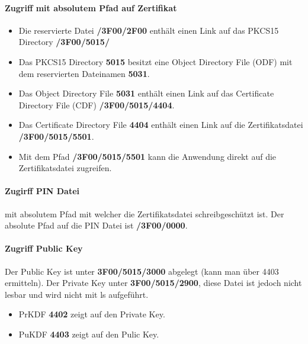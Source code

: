 \paragraph{Zugriff mit absolutem Pfad auf Zertifikat}
\begin{itemize}
    \item Die reservierte Datei \textbf{/3F00/2F00} enthält einen Link auf das PKCS15 Directory \textbf{/3F00/5015/}
    \item Das PKCS15 Directory \textbf{5015} besitzt eine Object Directory File (ODF) mit dem reservierten Dateinamen \textbf{5031}.
    \item Das Object Directory File \textbf{5031} enthält einen Link auf das Certificate Directory File (CDF) \textbf{/3F00/5015/4404}.
    \item Das Certificate Directory File \textbf{4404} enthält einen Link auf die Zertifikatsdatei \textbf{/3F00/5015/5501}.
    \item Mit dem Pfad \textbf{/3F00/5015/5501} kann die Anwendung direkt auf die Zertifikatsdatei zugreifen.
\end{itemize}


\paragraph{Zugirff PIN Datei} mit absolutem Pfad mit welcher die Zertifikatsdatei schreibgeschützt ist. Der absolute Pfad auf die PIN Datei ist \textbf{/3F00/0000}.

\paragraph{Zugriff Public Key} Der Public Key ist unter \textbf{3F00/5015/3000} abgelegt (kann man über 4403 ermitteln). Der Private Key unter \textbf{3F00/5015/2900}, diese Datei ist jedoch nicht lesbar und wird nicht mit ls aufgeführt.
\begin{itemize}
    \item PrKDF \textbf{4402} zeigt auf den Private Key.
    \item PuKDF \textbf{4403} zeigt auf den Pulic Key.
\end{itemize}



